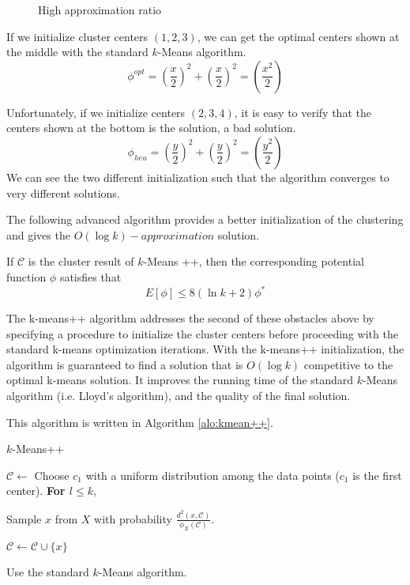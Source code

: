 		 \begin{figure}[htbp]
		 	\caption{High approximation ratio}
		 	\label{alo:algorithm ratio}
		 \end{figure}

	       If we initialize cluster centers $(1, 2, 3)$, we can get the optimal centers shown at the middle with the standard $k$-Means algorithm.
	        \begin{equation}
	        \phi^{opt} = (\frac{x}{2})^{2}+(\frac{x}{2})^{2}=(\frac{x^{2}}{2})
	        \end{equation}

	        Unfortunately, if we initialize centers $(2, 3 ,4)$, it is easy to verify that the centers shown at the bottom is the solution, a bad solution.
	         \begin{equation}
	          \phi_{heu} = (\frac{y}{2})^{2}+(\frac{y}{2})^{2}=(\frac{y^{2}}{2})
	        \end{equation}
	        We can see the two different initialization such that the algorithm converges to very different solutions.

	 The following advanced algorithm provides a better initialization of the clustering and gives the $O(\log k)-approximation$ solution.
	 \begin{theorem}
	 \label{competitive}
	 If $\mathcal{C}$ is the cluster result of $k$-Means ++, then the corresponding potential function $\phi$ satisfies that 
	 \begin{equation}
	 E[\phi] \leq 8(\ln k + 2)\phi^{*}
	 \end{equation}
	 \end{theorem}

	The k-means++ algorithm addresses the second of these obstacles above by specifying a procedure to initialize the cluster centers before proceeding with the standard k-means optimization iterations. With the k-means++ initialization, the algorithm is guaranteed to find a solution that is $ O(\log k) $ competitive to the optimal k-means solution. It improves the running time of the standard $k$-Means algorithm (i.e. Lloyd's algorithm), and the quality of the final solution.

	This algorithm is written in Algorithm \ref{alo:kmean++}.

	\begin{algorithm}[H]
		\begin{algorithmic}[1]
			\caption{$k$-Means++}
			\label{alo:kmean++}
			\State $\mathcal{C}\leftarrow$ Choose $c_1$ with a uniform distribution among the data points ($c_1$ is the first center).
			\State \textbf{For $l \leq k$},

		Sample $x$ from $X$ with probability $\frac{d^{2}(x, \mathcal{C})}{\phi_{X}(\mathcal{C})}$.
		    
		    $\mathcal{C} \leftarrow \mathcal{C}\cup\{x\}$
		    
		    \State Use the standard $k$-Means algorithm.
		\end{algorithmic}
	\end{algorithm}

